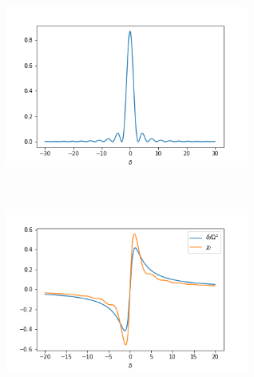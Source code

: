 \begin{ex}
    \label{ex7.19}
    \
    \begin{figure}[H]
        \begin{center}
            \includegraphics[width = 80mm]{./fig/ex7_19.png}
        \end{center}
    \end{figure}
\end{ex}

\begin{ex}
    \label{ex7.20}
    \
    \begin{figure}[H]
        \begin{center}
            \includegraphics[width = 80mm]{./fig/ex7_20.png}
        \end{center}
    \end{figure}
\end{ex}

